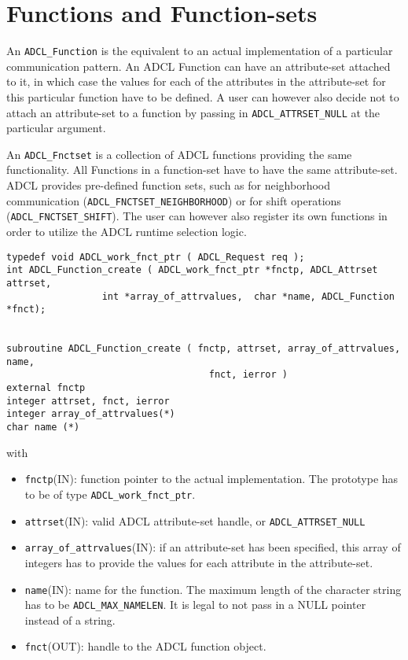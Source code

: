 \section{Functions and Function-sets}

An {\tt ADCL\_Function} is the equivalent to an actual implementation of a particular communication pattern. An ADCL Function can have an attribute-set attached to it, in which case the values for each of the attributes in the attribute-set for this particular function have to be defined. A user can however also decide not to attach an attribute-set to a function by passing in {\tt ADCL\_ATTRSET\_NULL} at the particular argument.

An {\tt ADCL\_Fnctset} is a collection of ADCL functions providing the same functionality. All Functions in a function-set have to have the same attribute-set. ADCL provides pre-defined function sets, such as for neighborhood communication ({\tt ADCL\_FNCTSET\_NEIGHBORHOOD}) or for shift operations ({\tt ADCL\_FNCTSET\_SHIFT}). The user can however also register its own functions in order to utilize the ADCL runtime selection logic.

\begin{verbatim}
typedef void ADCL_work_fnct_ptr ( ADCL_Request req );
int ADCL_Function_create ( ADCL_work_fnct_ptr *fnctp, ADCL_Attrset attrset, 
				 int *array_of_attrvalues,  char *name, ADCL_Function *fnct);


subroutine ADCL_Function_create ( fnctp, attrset, array_of_attrvalues, name, 
	                                fnct, ierror )
external fnctp
integer attrset, fnct, ierror
integer array_of_attrvalues(*)
char name (*)	                                

\end{verbatim}
with
\begin{itemize}
\item {\tt fnctp}(IN): function pointer to the actual implementation. The prototype has
     to be of type {\tt ADCL\_work\_fnct\_ptr}.
\item {\tt attrset}(IN): valid ADCL attribute-set handle, or {\tt ADCL\_ATTRSET\_NULL}
\item {\tt array\_of\_attrvalues}(IN): if an attribute-set has been specified, this array of
 integers has to provide the values for each attribute in the attribute-set. 
\item {\tt name}(IN): name for the function. The maximum length of the character string has to be 
  {\tt ADCL\_MAX\_NAMELEN}. It is legal to not pass in a NULL pointer instead of a string.
\item {\tt fnct}(OUT): handle to the ADCL function object.
\end{itemize}


